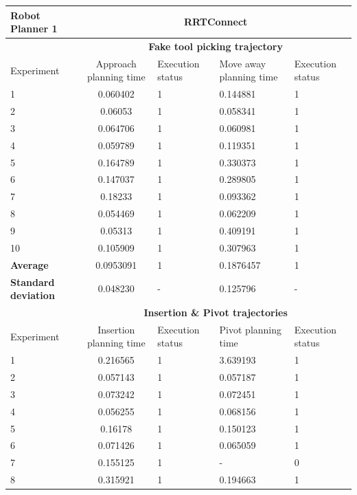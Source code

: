 \begin{table}[H]
\centering
\begin{tabular}{|p{2cm}|c|p{2cm}|p{2cm}|p{2cm}|}
\hline
Robot Planner 1           & \multicolumn{4}{c}{\textbf{RRTConnect}}                                                                                                 \vline \\
\hline
                          & \multicolumn{4}{c}{\textbf{Fake tool picking trajectory}}                     \vline \\
\hline
Experiment                & Approach planning time & Execution status & Move away planning time & Execution status  \\
\hline
1 &	0.060402 &	1 &	0.144881 &	1 \\
2 &	0.06053 &	1 &	0.058341 &	1 \\
3 &	0.064706 &	1 &	0.060981 &	1 \\
4 &	0.059789 &	1 &	0.119351 &	1 \\
5 &	0.164789 &	1 &	0.330373 &	1 \\
6 &	0.147037 &	1 &	0.289805 &	1 \\
7 &	0.18233 &	1 &	0.093362 &	1 \\
8 &	0.054469 &	1 &	0.062209 &	1 \\
9 &	0.05313 &	1 &	0.409191 &	1 \\
10 &	0.105909 &	1 &	0.307963 &	1 \\
\hline
\textbf{Average} & 	0.0953091 &	1	& 0.1876457	& 1 \\
\hline
\textbf{Standard deviation} & 	0.048230 &	- &	0.125796 & - \\
\hline
                          & \multicolumn{4}{c}{\textbf{Insertion \& Pivot trajectories}}                     \vline \\
\hline
Experiment                & Insertion planning time & Execution status & Pivot planning time & Execution status  \\
\hline
1	& 0.216565	& 1	& 3.639193	& 1 \\
2	& 0.057143	& 1	& 0.057187	& 1 \\
3	& 0.073242	& 1	& 0.072451	& 1 \\
4	& 0.056255	& 1	& 0.068156	& 1 \\
5	& 0.16178	& 1	& 0.150123	& 1 \\
6	& 0.071426	& 1	& 0.065059	& 1 \\
7	& 0.155125	& 1	& -	& 0 \\
8	& 0.315921	& 1	& 0.194663	& 1 \\

\end{tabular}
\end{table}
